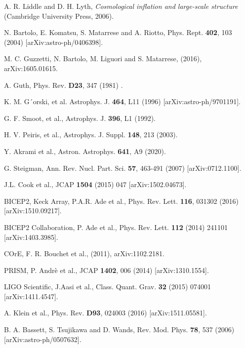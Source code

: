 \documentclass[11pt,a4paper,twoside]{book}
\begin{document}
\begin{thebibliography}{2}
	
	 A. R. Liddle and D. H. Lyth, \emph{Cosmological inflation and large-scale structure} (Cambridge University Press, 2006).
	
	 N. Bartolo, E. Komatsu, S. Matarrese and A. Riotto, Phys. Rept. \textbf{402}, 103 (2004) [arXiv:astro-ph/0406398].
	
	 M. C. Guzzetti, N. Bartolo, M. Liguori and S. Matarrese, (2016), arXiv:1605.01615. 
	
	 A. Guth, Phys. Rev. \textbf{D23}, 347 (1981) .
	
	 K. M. G´orski, et al. Astrophys. J. \textbf{464}, L11 (1996) [arXiv:astro-ph/9701191].
	
	 G. F. Smoot, et al., Astrophys. J. \textbf{396}, L1 (1992).

     H. V. Peiris, et al., Astrophys. J. Suppl. \textbf{148}, 213 (2003).
	
	 Y. Akrami et al., Astron. Astrophys. \textbf{641}, A9 (2020).
	
	 G. Steigman, Ann. Rev. Nucl. Part. Sci. \textbf{57}, 463-491 (2007) [arXiv:0712.1100].
	
	 J.L. Cook et al., JCAP \textbf{1504} (2015) 047 [arXiv:1502.04673].
	
	 BICEP2, Keck Array, P.A.R. Ade et al., Phys. Rev. Lett. \textbf{116}, 031302 (2016) [arXiv:1510.09217].
	
	 BICEP2 Collaboration, P. Ade et al., Phys. Rev. Lett. \textbf{112} (2014) 241101 [arXiv:1403.3985].
	
	 COrE, F. R. Bouchet et al., (2011), arXiv:1102.2181.  
	
	 PRISM, P. Andrè et al., JCAP \textbf{1402}, 006 (2014) [arXiv:1310.1554].
	
	 LIGO Scientific, J.Aasi et al., Class. Quant. Grav. \textbf{32} (2015) 074001 [arXiv:1411.4547].
	
	 A. Klein et al., Phys. Rev. \textbf{D93}, 024003 (2016) [arXiv:1511.05581].
	
	 B. A. Bassett, S. Tsujikawa and D. Wands, Rev. Mod. Phys. \textbf{78}, 537 (2006) [arXiv:astro-ph/0507632].
	

\end{thebibliography}
\end{document}

